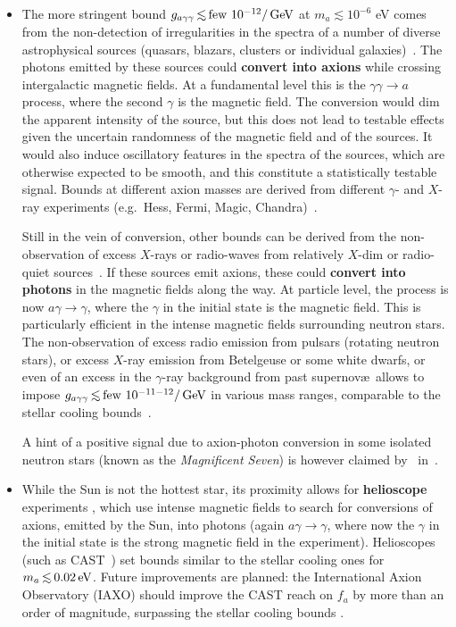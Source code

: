 \begin{itemize}
\item[$-$]
The more stringent bound $g_{a\gamma\gamma}\circa{<}{\rm few}~10^{-12}/\GeV$ at $m_a \lesssim 10^{-6}$ eV comes from the non-detection of irregularities in the spectra of a number of diverse astrophysical sources (quasars, blazars, clusters or individual galaxies)~\cite{axionconversion}. The photons emitted by these sources could {\bf convert into axions} while crossing intergalactic magnetic fields.
At a fundamental level this is the $\gamma\gamma \to a$ process, where the second $\gamma$ is the magnetic field. 
The conversion would dim the apparent intensity of the source, but this does not lead to testable effects given the uncertain randomness of the magnetic field and of the sources. 
It would also induce oscillatory features in the spectra of the sources, which are otherwise expected to be smooth, and this constitute a statistically testable signal.
Bounds at different axion masses are derived from different $\gamma$- and $X$-ray experiments (e.g.~{\sc Hess}, {\sc Fermi}, {\sc Magic}, {\sc Chandra})~\cite{axionconversion}. 

Still in the vein of conversion, other bounds can be derived from the non-observation of excess $X$-rays or radio-waves from relatively $X$-dim or radio-quiet sources~\cite{axionconversion2}. If these sources emit axions, these could {\bf convert into photons} in the magnetic fields along the way.
At particle level, the process is now  $a\gamma \to \gamma$, where the $\gamma$ in the initial state is the magnetic field. 
This is particularly efficient in the intense magnetic fields surrounding neutron stars. 
The non-observation of excess radio emission from pulsars (rotating neutron stars), or excess $X$-ray emission from Betelgeuse or some white dwarfs, or even of an excess in the $\gamma$-ray background from past supernov\ae\ allows to impose $g_{a\gamma\gamma}\circa{<}{\rm few}~10^{-11-12}/\GeV$ in various mass ranges, comparable to the stellar cooling bounds~\cite{axionconversion2}.

A hint of a positive signal due to axion-photon conversion in some isolated neutron stars (known as the {\em Magnificent Seven}) is however claimed by \ in~\cite{axionconversion2}.


\item[$-$] While the Sun is not the hottest star, its proximity allows for
{\bf helioscope} experiments \cite{Sikivie:1983ip}, which
use intense magnetic fields to search for conversions of axions, emitted by the Sun, into photons (again $a\gamma\to\gamma$, where now the $\gamma$ in the initial state is the strong magnetic field in the experiment).
Helioscopes (such as CAST~\cite{CAST})  set bounds similar to the stellar cooling ones for $m_a\circa{<}0.02\eV$.
Future improvements are planned: the International Axion Observatory (IAXO) should improve the CAST reach on $f_a$ by more than an order of magnitude, surpassing the stellar cooling bounds \cite{IAXO}.


\end{itemize}
